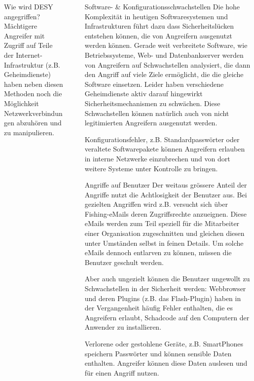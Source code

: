 \documentclass[final]{beamer}
\newlength{\sepwid}
\newlength{\twocolwid}
\begin{document}
\begin{frame}[t]
\begin{columns}[t, totalwidth=\textwidth]
\begin{column}{\twocolwid}
\begin{block}{Wie wird DESY angegriffen?}
Mächtigere Angreifer mit Zugriff auf Teile der Internet-Infrastruktur 
(z.B. Geheimdienste) haben neben diesen Methoden noch die Möglichkeit 
Netzwerkverbindungen abzuhören und zu manipulieren.

\end{block}


\end{column} %

\begin{column}{\sepwid}\end{column} %

\begin{column}{\twocolwid} %

\begin{block}{Software- \& Konfigurationsschwachstellen}
 Die hohe Komplexität in heutigen Softwaresystemen und Infrastrukturen führt dazu dass
 Sicherheitslücken entstehen können, die von Angreifern ausgenutzt werden können. 
 Gerade weit verbreitete Software, wie Betriebssysteme, Web- und Datenbankserver werden 
 von Angreifern auf Schwachstellen analysiert, die dann den Angriff auf viele Ziele ermöglicht, 
 die die gleiche Software einsetzen. Leider haben verschiedene Geheimdienste
 aktiv darauf hingewirkt Sicherheitsmechanismen zu 		schwächen. Diese Schwachstellen können
 natürlich auch von nicht legitimierten Angreifern ausgenutzt werden.
 \par
 Konfigurationsfehler, z.B. Standardpasswörter oder veraltete Softwarepakete können
 Angreifern erlauben in interne Netzwerke einzubrechen und von dort weitere Systeme 
 unter Kontrolle zu bringen.
\end{block}

\begin{block}{Angriffe auf Benutzer}
 Der weitaus grössere Anteil der Angriffe nutzt die Achtlosigkeit der Benutzer aus. 
 Bei gezielten Angriffen wird z.B. versucht sich über Fishing-eMails deren Zugriffsrechte anzueignen. 
 Diese eMails werden zum Teil speziell für die Mitarbeiter einer Organisation zugeschnitten 
 und gleichen diesen unter Umständen selbst in feinen Details. Um solche eMails dennoch 
 entlarven zu können, müssen die Benutzer geschult werden.
 \par
 Aber auch ungezielt können die Benutzer ungewollt zu Schwachstellen in der Sicherheit werden:
 Webbrowser und deren Plugins (z.B. das Flash-Plugin) haben in der Vergangenheit häufig
 Fehler enthalten, die es Angreifern erlaubt, Schadcode auf den Computern der Anwender zu 
 installieren.
 \par
 Verlorene oder gestohlene Geräte, z.B. SmartPhones speichern Passwörter und können sensible 
 Daten enthalten. Angreifer können diese Daten auslesen und für einen Angriff nutzen.
\end{block}


\end{column}
\end{columns}
\end{frame}
\end{document}
